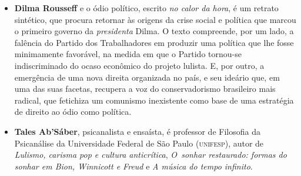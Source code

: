 \begin{itemize}


\item \textbf{Dilma Rousseff} e o ódio político, escrito \emph{no calor da
hora}, é um retrato sintético, que procura retornar às origens da crise social e
política que marcou o primeiro governo da \emph{presidenta} Dilma. O texto
compreende, por um lado, a falência do Partido dos Trabalhadores em produzir uma
política que lhe fosse minimamente favorável, na medida em que o Partido
tornou-se indiscriminado do ocaso econômico do projeto lulista. E, por outro, a
emergência de uma nova direita organizada no país, e seu ideário que, em uma das
suas facetas, recupera a voz do conservadorismo brasileiro mais radical, que
fetichiza um comunismo inexistente como base de uma estratégia de direito ao
ódio como política. 
  
\item \textbf{Tales Ab’Sáber}, psicanalista e ensaísta, é professor de Filosofia da Psicanálise da Universidade Federal 
de São Paulo (\textsc{unifesp}), autor de 
\emph{Lulismo, carisma pop e cultura anticrítica},
\textit{O~sonhar
restaurado: formas do sonhar em Bion, Winnicott e Freud} e
\textit{A música do tempo infinito}. 

\end{itemize}


